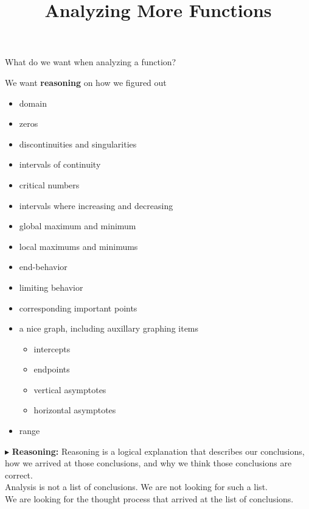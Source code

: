\documentclass{ximera}
\title{Analyzing More Functions}
\begin{document}
\begin{abstract}
%
\end{abstract}
\maketitle








What do we want when analyzing a function?


We want \textbf{\textcolor{red!80!black}{reasoning}} on how we figured out

\begin{itemize}
\item domain
\item zeros 
\item discontinuities and singularities
\item intervals of continuity
\item critical numbers
\item intervals where increasing and decreasing
\item global maximum and minimum
\item local maximums and minimums
\item end-behavior
\item limiting behavior
\item corresponding important points
\item a nice graph, including auxillary graphing items
\begin{itemize}
	\item intercepts
	\item endpoints
	\item vertical asymptotes
	\item horizontal asymptotes
\end{itemize}
\item range
\end{itemize}



$\blacktriangleright$ \textbf{\textcolor{red!80!black}{Reasoning:}} Reasoning is a logical explanation that describes our conclusions, how we arrived at those conclusions, and why we think those conclusions are correct. \\

Analysis is not a list of conclusions. We are not looking for such a list. \\

We are looking for the thought process that arrived at the list of conclusions. \\
\end{document}
